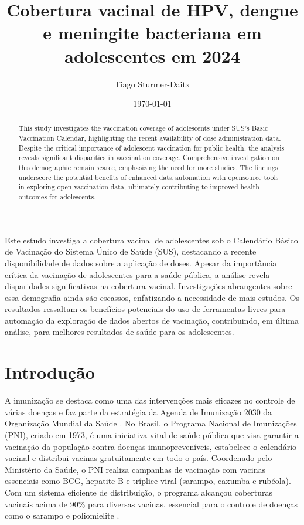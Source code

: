 \documentclass[12pt]{article}
\date{\today}
\title{
    Cobertura vacinal de HPV, dengue e meningite bacteriana em adolescentes em 2024
}
\author{Tiago Sturmer-Daitx\inst{1}}
\begin{document}
\imprimircapa
\imprimirfolhaderosto


\maketitle

\begin{abstract}
This study investigates the vaccination coverage of adolescents under SUS's Basic Vaccination Calendar, highlighting the recent availability of dose administration data. Despite the critical importance of adolescent vaccination for public health,  the analysis reveals significant disparities in vaccination coverage. Comprehensive investigation on this demographic remain scarce, emphasizing the need for more studies. The findings underscore the potential benefits of enhanced data automation with opensource tools in exploring open vaccination data, ultimately contributing to improved health outcomes for adolescents.
\end{abstract}

\begin{resumo}
Este estudo investiga a cobertura vacinal de adolescentes sob o Calendário Básico de Vacinação do Sistema Único de Saúde (SUS), destacando a recente disponibilidade de dados sobre a aplicação de doses. Apesar da importância crítica da vacinação de adolescentes para a saúde pública, a análise revela disparidades significativas na cobertura vacinal. Investigações abrangentes sobre essa demografia ainda são escassos, enfatizando a necessidade de mais estudos. Os resultados ressaltam os benefícios potenciais do uso de ferramentas livres para automação da exploração de dados abertos de vacinação, contribuindo, em última análise, para melhores resultados de saúde para os adolescentes.
\end{resumo}


\section{Introdução} \label{introducao}

A imunização se destaca como uma das intervenções mais eficazes no controle de várias doenças e faz parte da estratégia da Agenda de Imunização 2030 da Organização Mundial da Saúde \cite{who_ia2030_2021}. No Brasil, o Programa Nacional de Imunizações (PNI), criado em 1973, é uma iniciativa vital de saúde pública que visa garantir a vacinação da população contra doenças imunopreveníveis, estabelece o calendário vacinal e distribui vacinas gratuitamente em todo o país. Coordenado pelo Ministério da Saúde, o PNI realiza campanhas de vacinação com vacinas essenciais como BCG, hepatite B e tríplice viral (sarampo, caxumba e rubéola). Com um sistema eficiente de distribuição, o programa alcançou coberturas vacinais acima de 90\% para diversas vacinas, essencial para o controle de doenças como o sarampo e poliomielite \cite{ministerio_da_saude_programa_2024}.
\end{document}
